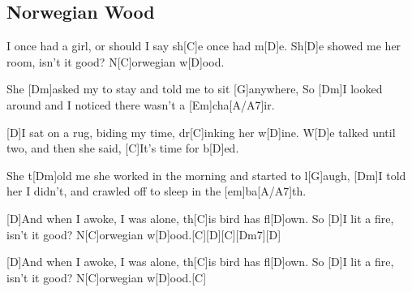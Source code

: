 \subsection*{Norwegian Wood   }
\begin{guitar}
[D]I once had a girl, or should I say
sh[C]e once had m[D]e.
Sh[D]e showed me her room, isn't it good?
N[C]orwegian w[D]ood.



She [Dm]asked my to stay and told me to sit [G]anywhere,
So [Dm]I looked around and I noticed there wasn't a [Em]cha[A/A7]ir.



[D]I sat on a rug, biding my time,
dr[C]inking her w[D]ine.
W[D]e talked until two, and then she said,
[C]It's time for b[D]ed.


She t[Dm]old me she worked in the morning and started to l[G]augh,
[Dm]I told her I didn't, and crawled off to sleep in the [em]ba[A/A7]th.



[D]And when I awoke, I was alone, th[C]is bird has fl[D]own.
So [D]I lit a fire, isn't it good?
N[C]orwegian w[D]ood.\qquad{}[C]{}[D]{}[C]{}[Dm7]{}[D]



[D]And when I awoke, I was alone, th[C]is bird has fl[D]own.
So [D]I lit a fire, isn't it good?
N[C]orwegian w[D]ood.\qquad{}[C]\qquad[D]\qquad[C]\qquad[Dm7]\qquad[D]\qquad
\end{guitar}

